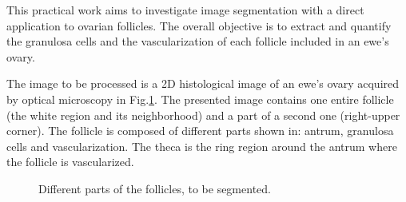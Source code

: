 \def\difficulty{1}

\vspace*{-15pt}

\begin{note}This practical work aims to investigate image segmentation with a direct application to o\-va\-rian follicles. The overall objective is to extract and quantify the granulosa cells and the vascularization of each follicle included in an ewe's ovary.
\end{note}

\vspace*{-5pt}

\noindent The image to be processed is a 2D histological image of an ewe's ovary acquired by optical microscopy in Fig.\ref{fig:follicle:enonce:parts}. The presented image contains one entire follicle (the white region and its neighborhood) and a part of a second one (right-upper corner). The follicle is composed of different parts shown in: antrum, granulosa cells and vascularization. The theca is the ring region around the antrum where the follicle is vascularized.

\vspace*{-10pt}

\begin{figure}[H]
\centering\caption{Different parts of the follicles, to be segmented.}%
\hfill
{}
\hfill
{}%
\vspace*{-10pt}%
\label{fig:follicle:enonce:parts}%
\end{figure}


